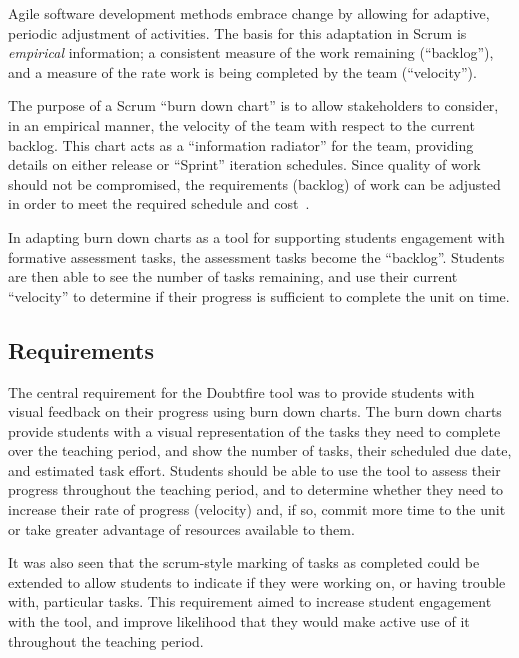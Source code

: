 Agile software development methods \cite{Beck:2001} embrace change \cite{Beck:2000} by allowing for adaptive, periodic adjustment of activities. The basis for this adaptation in Scrum is \emph{empirical} information; a consistent measure of the work remaining (``backlog''), and a measure of the rate work is being completed by the team (``velocity'').

The purpose of a Scrum ``burn down chart'' is to allow stakeholders to consider, in an empirical manner, the velocity of the team with respect to the current backlog. This chart acts as a ``information radiator'' \cite{Cockburn:2002} for the team, providing details on either release or ``Sprint'' iteration schedules. Since quality of work should not be compromised, the requirements (backlog) of work can be adjusted in order to meet the required schedule and cost~\cite{Sutherland:2007}.

In adapting burn down charts as a tool for supporting students engagement with formative assessment tasks, the assessment tasks become the ``backlog''. Students are then able to see the number of tasks remaining, and use their current ``velocity'' to determine if their progress is sufficient to complete the unit on time.


\subsection{Requirements} %
\label{sub:doubtfire_requirements}

The central requirement for the Doubtfire tool was to provide students with visual feedback on their progress using burn down charts. The burn down charts provide students with a visual representation of the tasks they need to complete over the teaching period, and show the number of tasks, their scheduled due date, and estimated task effort. Students should be able to use the tool to assess their progress throughout the teaching period, and to determine whether they need to increase their rate of progress (velocity) and, if so, commit more time to the unit or take greater advantage of resources available to them. 

It was also seen that the scrum-style marking of tasks as completed could be extended to allow students to indicate if they were working on, or having trouble with, particular tasks. This requirement aimed to increase student engagement with the tool, and improve likelihood that they would make active use of it throughout the teaching period.

